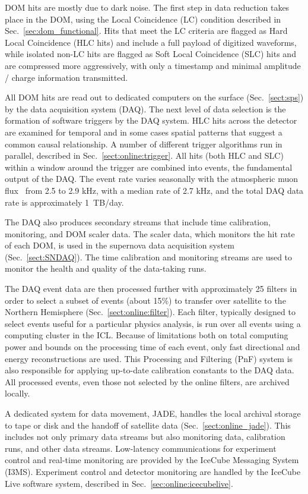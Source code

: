 DOM hits are mostly due to dark noise. The first step
in data reduction takes place in the DOM, using the Local Coincidence (LC) condition described in
Sec.~\ref{sec:dom_functional}.  Hits that meet the LC criteria are flagged
as Hard Local Coincidence (HLC hits) and include a full payload of
digitized waveforms, while isolated non-LC hits are flagged as Soft Local
Coincidence (SLC) hits and are compressed more aggressively, with only a
timestamp and minimal amplitude / charge information transmitted.

All DOM hits are read out to dedicated computers on the surface
(Sec.~\ref{sect:sps}) by the data acquisition system (DAQ).  The next level
of data selection is the formation of software triggers by the DAQ
system. HLC hits across the detector are examined 
for temporal and in some cases spatial patterns that suggest a common
causal relationship.  A number of different trigger algorithms run in
parallel, described in Sec.~\ref{sect:online:trigger}.  All hits (both HLC
and SLC) within a window around the trigger are combined into events, the
fundamental output of the DAQ.  The event rate varies
seasonally with the atmospheric muon flux~\cite{ICECUBE:IceTop} from 2.5 to
2.9 kHz, with a median rate of 2.7 kHz, and the total DAQ data rate is
approximately 1~TB/day. 

The DAQ also produces secondary streams that include time calibration,
monitoring, and DOM scaler data.  The scaler data, which monitors the
hit rate of each DOM, is used in the supernova data
acquisition system (Sec.~\ref{sect:SNDAQ}).  The time calibration and
monitoring streams are used to monitor the health and quality of the
data-taking runs.

The DAQ event data are then processed further with approximately 25 filters
in order to select a subset of events (about 15\%) to transfer over
satellite to the Northern Hemisphere (Sec.~\ref{sect:online:filter}).  Each
filter, typically designed to select events useful for a particular physics
analysis, is run over all events using a computing cluster in the ICL.
Because of limitations both on total computing power and bounds on the
processing time of each event, only fast directional and energy
reconstructions are used.  This Processing and Filtering (PnF) system is
also responsible for applying up-to-date calibration constants to the DAQ
data. All processed events, even those not selected by the online filters,
are archived locally.

A dedicated system for data movement, JADE, handles the local archival storage to
tape or disk and the handoff of satellite data
(Sec.~\ref{sect:online_jade}).  This includes not only primary data streams
but also monitoring data, calibration runs, and other data streams.
Low-latency communications for experiment control and real-time monitoring
are provided by the IceCube Messaging System (I3MS).  
Experiment control and detector monitoring are handled by the IceCube Live
software system, described in Sec.~\ref{sec:online:icecubelive}.

